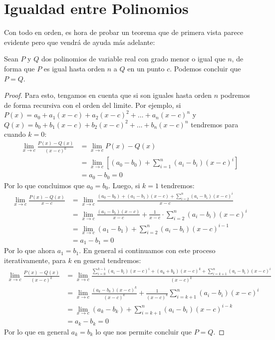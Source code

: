 \documentclass[12pt,a4paper,oneside]{memoir}
\begin{document}
\section*{Igualdad entre Polinomios}
Con todo en orden, es hora de probar un teorema que de primera vista parece evidente pero que vendrá de ayuda más adelante:
\begin{theorem}
    Sean $P$ y $Q$ dos polinomios de variable real con grado menor o igual que $n$, de forma que $P$ es igual hasta orden $n$ a $Q$ en un punto $c$. Podemos concluir que $P = Q$.
\end{theorem}
\begin{proof}
    Para esto, tengamos en cuenta que si son iguales hasta orden $n$ podremos de forma recursiva con el orden del limite. Por ejemplo, si $P(x) = a_0 + a_1(x-c)+a_2(x-c)^2 + \dots + a_n(x-c)^n$ y $Q(x) = b_0 + b_1(x-c) + b_2(x-c)^2 + \dots + b_n(x-c)^n$ tendremos para cuando $k = 0$:
    \begin{align*}
        \lim_{x \to c} \frac{P(x) - Q(x)}{(x-c)^0} &= \lim_{x \to c} P(x) - Q(x)\\
        &=\lim_{x \to c} \left[(a_0 - b_0) + \sum_{i = 1}^n (a_i - b_i) (x-c)^i\right]\\
        &= a_0 - b_0 = 0
    \end{align*}
    Por lo que concluimos que $a_0 = b_0$. Luego, si $k = 1$ tendremos:
    \begin{align*}
        \lim_{x \to c} \frac{P(x) - Q(x)}{x-c} &= \lim_{x \to c} \frac{(a_0 - b_0) + (a_1 - b_1)(x-c) + \sum_{i = 2}^n (a_i - b_i)(x-c)^i}{x-c}\\
        &= \lim_{x \to c} \frac{(a_1 - b_1)(x-c)}{x-c} + \frac{1}{x-c} \cdot \sum_{i = 2}^n (a_i - b_i)(x-c)^i\\
        &= \lim_{x \to c} (a_1-b_1) + \sum_{i = 2}^n (a_i - b_i)(x-c)^{i-1}\\
        &= a_1 - b_1 = 0
    \end{align*}
    Por lo que ahora $a_1 = b_1$. En general si continuamos con este proceso iterativamente, para $k$ en general tendremos:
    \begin{align*}
        \lim_{x \to c}\frac{P(x)-Q(x)}{(x-c)^k} &= \lim_{x \to c} \frac{\sum_{i = 0}^{k-1} (a_i-b_i)(x-c)^i + (a_k + b_k)(x-c)^k + \sum_{i = k+1}^n (a_i - b_i)(x-c)^i}{(x-c)^k}\\
        &= \lim_{x \to c} \frac{(a_k-b_k)(x-c)^k}{(x-c)^k} + \frac{1}{(x-c)^k} \sum_{i = k+1}^n (a_i - b_i)(x-c)^i\\
        &= \lim_{x \to c} (a_k - b_k) + \sum_{i = k+1}^n (a_i - b_i)(x-c)^{i-k}\\
        &= a_k - b_k = 0
    \end{align*}
    Por lo que en general $a_k = b_k$ lo que nos permite concluir que $P = Q$.
\end{proof}
\end{document}
